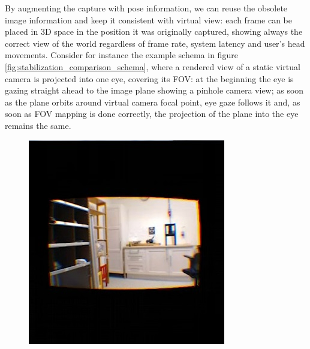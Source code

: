 By augmenting the capture with pose information, we can reuse the obsolete image information and keep it consistent with virtual view: each frame can be placed in 3D space in the position it was originally captured, showing always the correct view of the world regardless of frame rate, system latency and user's head movements. Consider for instance the example schema in figure \ref{fig:stabilization_comparison_schema}, where a rendered view of a static virtual camera is projected into one eye, covering its FOV: at the beginning the eye is gazing straight ahead to the image plane showing a pinhole camera view; as soon as the plane orbits around virtual camera focal point, eye gaze follows it and, as soon as FOV mapping is done correctly, the projection of the plane into the eye remains the same.

\begin{figure} 
\centering   
\begin{minipage}[t]{0.45\textwidth}
\includegraphics[width=\linewidth]{pictures/no_stabilization_rotation}
\end{minipage}
\begin{minipage}[t]{0.46\textwidth}

\end{minipage}
\end{figure}
